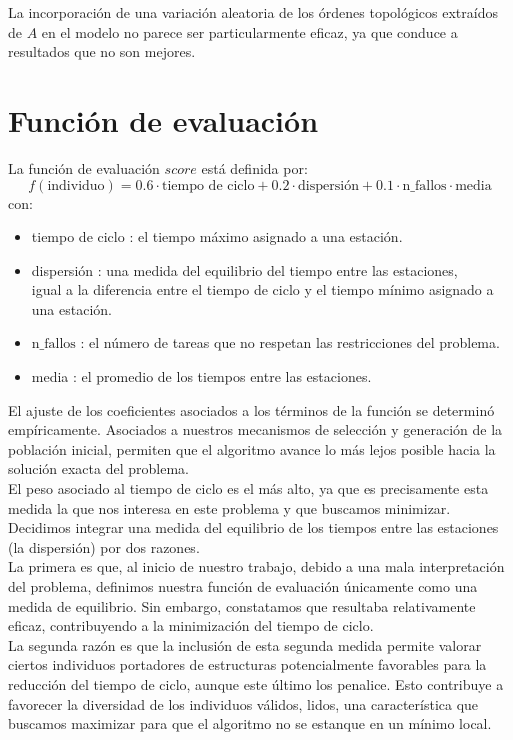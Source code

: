 \documentclass[12pt]{report}
\begin{document}
La incorporación de una variación aleatoria de los órdenes topológicos extraídos de $A$ en el modelo no parece ser particularmente eficaz, ya que conduce a resultados que no son mejores.

\section{Función de evaluación}

La función de evaluación $score$ está definida por: \\
\[
f(\text{individuo}) = 0.6 \cdot \text{tiempo de ciclo} + 0.2 \cdot \text{dispersión} + 0.1 \cdot \text{n\_fallos} \cdot \text{media}
\]
con:\\
\begin{itemize}
\item tiempo de ciclo : el tiempo máximo asignado a una estación.
\item dispersión : una medida del equilibrio del tiempo entre las estaciones,\\
igual a la diferencia entre el tiempo de ciclo y el tiempo mínimo asignado a una estación.
\item $\text{n\_fallos}$ : el número de tareas que no respetan las restricciones del problema.
\item media : el promedio de los tiempos entre las estaciones.
\end{itemize}

El ajuste de los coeficientes asociados a los términos de la función se determinó empíricamente. Asociados a nuestros mecanismos de selección y generación de la población inicial, permiten que el algoritmo avance lo más lejos posible hacia la solución exacta del problema.\\

El peso asociado al tiempo de ciclo es el más alto, ya que es precisamente esta medida la que nos interesa en este problema y que buscamos minimizar.\\

Decidimos integrar una medida del equilibrio de los tiempos entre las estaciones (la dispersión) por dos razones.\\
La primera es que, al inicio de nuestro trabajo, debido a una mala interpretación del problema, definimos nuestra función de evaluación únicamente como una medida de equilibrio. Sin embargo, constatamos que resultaba relativamente eficaz, contribuyendo a la minimización del tiempo de ciclo.\\
La segunda razón es que la inclusión de esta segunda medida permite valorar ciertos individuos portadores de estructuras potencialmente favorables para la reducción del tiempo de ciclo, aunque este último los penalice. Esto contribuye a favorecer la diversidad de los individuos válidos, lidos, una característica que buscamos maximizar para que el algoritmo no se estanque en un mínimo local.\\
\end{document}
